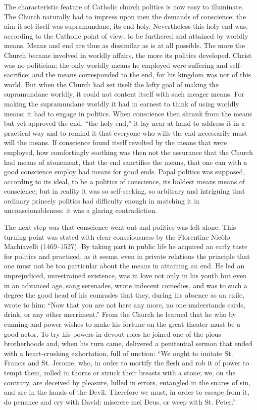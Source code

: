 \documentclass[12pt,a4paper,openany]{book}
\newcommand{\opage}[1]{\marginnote{\footnotesize\textit{[#1]}}}
\begin{document}
The characteristic feature of Catholic church politics
is now easy to illuminate. The Church naturally had to impress upon
men the demands of conscience; the aim it
set itself was supramundane, its end holy.
Nevertheless this holy end was, according to the Catholic point of view,
to be furthered and attained by worldly means. Means and end are thus as
dissimilar as is at all possible. The more the Church
\setcounter{footnote}{0}%
\opage{92}became involved in worldly affairs, the more its
politics developed. Christ was no politician; the
only worldly means he employed were suffering and
self-sacrifice; and the means corresponded to the end, for his
kingdom was not of this world. But when the Church had
set itself the lofty goal of making the supramundane worldly,
it could not content itself with such meager means.
For making the supramundane worldly it had in
earnest to think of using worldly means; it
had to engage in politics. When conscience then shrank
from the means but yet approved the end, ``the
holy end,'' it lay near at hand to address it in a practical
way and to remind it that everyone who wills the end necessarily
must will the means. If conscience found itself revolted
by the means that were employed, how comfortingly soothing
was then not the assurance that the Church had means of atonement,
that the end sanctifies the means, that one can with a good
conscience employ bad means for good ends.
Papal politics was supposed, according to its ideal, to be a
politics of conscience, its boldest means means of conscience;
but in reality it was so self-seeking,
so arbitrary and intriguing that ordinary princely politics
had difficulty enough in matching it in
unconscionableness: it was a glaring contradiction.

The next step was that conscience went out and
politics was left alone. This turning point was
stated with clear consciousness by the Florentine Nicòlo
Machiavelli (1469--1527). By taking part in
public life he acquired an early taste for politics and practiced,
as it seems, even in private relations the principle
that one must not be too particular about the means in attaining an end.
He led an unprejudiced,
\setcounter{footnote}{0}%
\opage{93}unrestrained existence, was in love not only in his youth
but even in an advanced age, sang serenades,
wrote indecent comedies, and was to such a degree the good
head of his comrades that they, during his absence as
an exile, wrote to him: ``Now that you are not here
any more, no one understands cards, drink, or
any other merriment.'' From the Church he learned that he who
by cunning and power wishes to make his fortune on the great theater
must be a good actor. To try his powers
in devout roles he joined one of the
pious brotherhoods and, when his turn came,
delivered a penitential sermon that ended with a heart-crushing exhortation,
full of unction: ``We ought to imitate St. Francis
and St. Jerome, who, in order to mortify the flesh and rob it of
power to tempt them, rolled in thorns or struck
their breasts with a stone; we, on the contrary, are deceived by
pleasure, lulled in errors, entangled in the snares
of sin, and are in the hands of the Devil. Therefore we must,
in order to escape from it, do penance and cry with David:
miserere mei Deus, or weep with St. Peter.''
\end{document}
